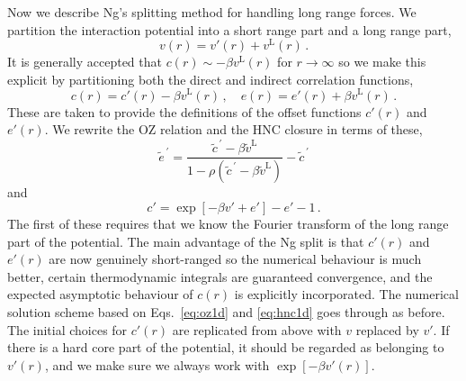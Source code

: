 \documentclass[12pt,a4paper]{article}
\newcommand{\lr}{^{\mathrm{L}}}
\newcommand{\tildevlr}{{\tilde v}\lr}
\newcommand{\myprime}{^{{}\,\prime}}
\newcommand{\Eqsref}[1]{Eqs.~\eqref{#1}}
\begin{document}
Now we describe Ng's splitting method for handling long range forces.
We partition the interaction potential into a short range part and a
long range part,
%
\begin{equation}
v(r)=v'(r)+v\lr(r)\,.
\end{equation}
%
It is generally accepted that $c(r)\sim-\beta v\lr(r)$ for
$r\to\infty$ so we make this explicit by partitioning both the direct
and indirect correlation functions,
%
\begin{equation}
c(r)=c'(r)-\beta v\lr(r)\,,\quad
e(r)=e'(r)+\beta v\lr(r)\,.
\end{equation}
%
These are taken to provide the definitions of the offset functions
$c'(r)$ and $e'(r)$.  We rewrite the OZ relation and the HNC closure
in terms of these,
%
\begin{equation}
\tilde e\myprime=\frac{\tilde c\myprime-\beta\tildevlr}{1-\rho(\tilde
  c\myprime-\beta\tildevlr)}-\tilde c\myprime
\label{eq:oz1d}
\end{equation}
and
\begin{equation}
c'=\exp[-\beta v'+e']-e'-1\,.
\label{eq:hnc1d}
\end{equation}
%
The first of these requires that we know the Fourier transform of the
long range part of the potential.  The main advantage of the Ng split
is that $c'(r)$ and $e'(r)$ are now genuinely short-ranged so the
numerical behaviour is much better, certain thermodynamic integrals
are guaranteed convergence, and the expected asymptotic behaviour of
$c(r)$ is explicitly incorporated.  The numerical solution scheme
based on \Eqsref{eq:oz1d} and \eqref{eq:hnc1d} goes through as before.
The initial choices for $c'(r)$ are replicated from above with $v$
replaced by $v'$.  If there is a hard core part of the potential, it
should be regarded as belonging to $v'(r)$, and we make sure we always
work with $\exp[-\beta v'(r)]$.
\end{document}
